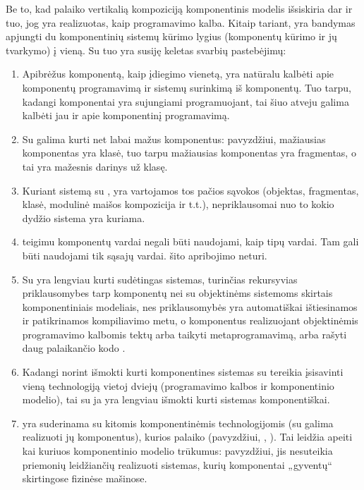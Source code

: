 Be to, kad palaiko vertikalią kompoziciją 
komponentinis modelis išsiskiria dar ir tuo, jog yra realizuotas, kaip
programavimo kalba. Kitaip tariant,  yra bandymas
apjungti du komponentinių sistemų kūrimo lygius (komponentų kūrimo
ir jų tvarkymo) į vieną. Su tuo yra susiję keletas svarbių pastebėjimų:
\begin{enumerate}
  \item Apibrėžus komponentą, kaip įdiegimo vienetą, yra natūralu
    kalbėti apie komponentų programavimą ir sistemų surinkimą iš
    komponentų. Tuo tarpu, kadangi  komponentai yra
    sujungiami programuojant, tai šiuo atveju galima kalbėti jau ir
    apie komponentinį programavimą.
  \item Su  galima kurti net labai mažus komponentus:
    pavyzdžiui,  mažiausias komponentas yra
     klasė, tuo tarpu  mažiausias
    komponentas yra fragmentas, o tai yra mažesnis darinys už klasę.
  \item Kuriant sistemą su , yra vartojamos tos
    pačios sąvokos (objektas, fragmentas, klasė, modulinė maišos
    kompozicija ir t.t.), nepriklausomai nuo to kokio dydžio
    sistema yra kuriama.
  \item \cite[36]{heineman2001component} teigimu komponentų vardai
    negali būti naudojami, kaip tipų vardai. Tam gali būti naudojami
    tik sąsajų vardai.  šito apribojimo neturi.
  \item Su  yra lengviau kurti sudėtingas sistemas,
    turinčias rekursyvias priklausomybes tarp komponentų nei su
    objektinėms sistemoms skirtais komponentiniais modeliais, nes
    priklausomybės yra automatiškai ištiesinamos ir patikrinamos
    kompiliavimo metu, o komponentus realizuojant objektinėmis
    programavimo kalbomis tektų arba taikyti metaprogramavimą,
    arba rašyti daug palaikančio kodo
    \cite[9]{scalable-component-abstractions}.
  \item Kadangi norint išmokti kurti komponentines sistemas su
     tereikia įsisavinti vieną technologiją
    vietoj dviejų (programavimo kalbos ir komponentinio modelio),
    tai su ja yra lengviau išmokti kurti sistemas komponentiškai.
  \item {} yra suderinama su kitomis komponentinėmis
    technologijomis (su  galima realizuoti jų
    komponentus), kurios palaiko  (pavyzdžiui,
    , ). Tai leidžia apeiti kai kuriuos
     komponentinio modelio trūkumus: pavyzdžiui,
    jis nesuteikia priemonių leidžiančių realizuoti sistemas, kurių
    komponentai „gyventų“ skirtingose fizinėse mašinose.
\end{enumerate}

